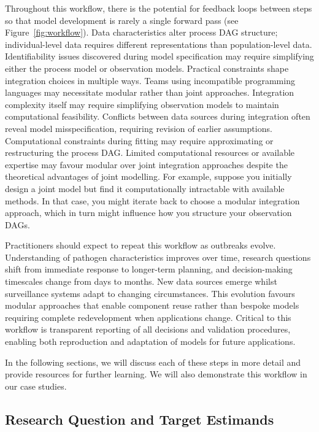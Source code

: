 \documentclass{article}
\begin{document}
Throughout this workflow, there is the potential for feedback loops between steps so that model development is rarely a single forward pass (see Figure~\ref{fig:workflow}). 
Data characteristics alter process DAG structure; individual-level data requires different representations than population-level data. 
Identifiability issues discovered during model specification may require simplifying either the process model or observation models. 
Practical constraints shape integration choices in multiple ways. Teams using incompatible programming languages may necessitate modular rather than joint approaches. 
Integration complexity itself may require simplifying observation models to maintain computational feasibility. Conflicts between data sources during integration often reveal model misspecification, requiring revision of earlier assumptions. 
Computational constraints during fitting may require approximating or restructuring the process DAG. Limited computational resources or available expertise may favour modular over joint integration approaches despite the theoretical advantages of joint modelling. 
For example, suppose you initially design a joint model but find it computationally intractable with available methods. In that case, you might iterate back to choose a modular integration approach, which in turn might influence how you structure your observation DAGs.

Practitioners should expect to repeat this workflow as outbreaks evolve.
Understanding of pathogen characteristics improves over time, research questions shift from immediate response to longer-term planning, and decision-making timescales change from days to months.
New data sources emerge whilst surveillance systems adapt to changing circumstances.
This evolution favours modular approaches that enable component reuse rather than bespoke models requiring complete redevelopment when applications change.
Critical to this workflow is transparent reporting of all decisions and validation procedures, enabling both reproduction and adaptation of models for future applications.

In the following sections, we will discuss each of these steps in more detail and provide resources for further learning. We will also demonstrate this workflow in our case studies.

\subsection{Research Question and Target Estimands}
\end{document}

